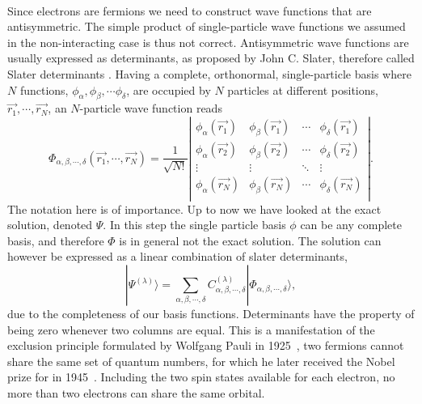 \paragraph*{}
Since electrons are fermions we need to construct wave functions that are antisymmetric.
The simple product of single-particle wave functions 
we assumed in the non-interacting case is thus not correct.
Antisymmetric wave functions are usually expressed as determinants, as proposed by John C. Slater, therefore called Slater determinants \cite{PhysRev.34.1293}.
Having a complete, orthonormal, single-particle basis where $N$ functions,  $\phi_{\alpha}, \phi_{\beta}, \cdots \phi_{\delta}$, are occupied by $N$ particles at different positions, $\vec{r_1}, \cdots , \vec{r_N}$, an $N$-particle wave function reads
\begin{equation}
\label{eq:manybody:slater}
\Phi_{\alpha,\beta,\cdots,\delta}(\vec{r_1},\cdots,\vec{r_N})
=
\frac{1}{\sqrt{N!}}
\left|
\begin{matrix}
\phi_{\alpha}(\vec{r_1}) & \phi_{\beta}(\vec{r_1}) & \cdots & \phi_{\delta}(\vec{r_1}) \\
\phi_{\alpha}(\vec{r_2}) & \phi_{\beta}(\vec{r_2}) & \cdots & \phi_{\delta}(\vec{r_2}) \\
\vdots                   & \vdots                  & \ddots & \vdots \\
\phi_{\alpha}(\vec{r_N}) & \phi_{\beta}(\vec{r_N}) & \cdots & \phi_{\delta}(\vec{r_N})\\
\end{matrix}
\right| .
\end{equation}
The notation here is of importance.
Up to now we have looked at the exact solution, denoted $\Psi$.
In this step the single particle basis $\phi$ can be any complete basis, and therefore $\Phi$ is in general not the exact solution.
The solution can however be expressed as a linear combination of slater determinants, 
\begin{equation}
|\Psi^{(\lambda)} \rangle = 
\sum_{\alpha,\beta,\cdots,\delta} C_{\alpha,\beta,\cdots,\delta}^{(\lambda)}
|\Phi_{\alpha,\beta,\cdots,\delta} \rangle ,
\end{equation}
due to the completeness of our basis functions.
Determinants have the property of being zero whenever two columns are equal.
This is a manifestation of the exclusion principle formulated by Wolfgang Pauli in 1925~\cite{springerlink:10.1007/BF02980631}, two fermions cannot share the same set of quantum numbers, 
for which he later received the Nobel prize for in 1945~\cite{nobelPauli}.
Including the two spin states available for each electron, no more than two electrons can share the same orbital.

